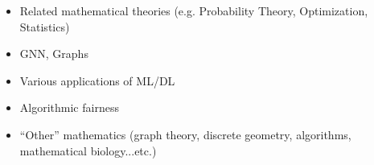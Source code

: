 \documentclass[10pt,a4]{article}
\begin{document}
\begin{small}
\begin{itemize}{}{}
\item Related mathematical theories (e.g. Probability Theory, Optimization, Statistics)

\item GNN, Graphs

\item Various applications of ML/DL

\item Algorithmic fairness

\item ``Other'' mathematics (graph theory, discrete geometry, algorithms, mathematical biology...etc.)
\end{itemize}
%
%
%

\end{small}
\end{document}
